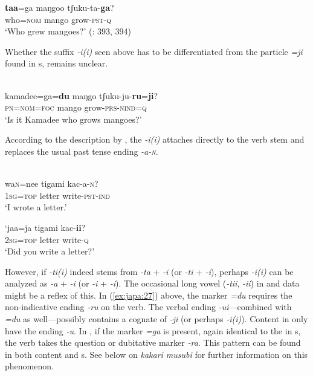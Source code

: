     \ex
    \gll \textbf{{taa}}=ga    maŋgoo  tʃuku-ta-\textbf{{ga}}?\\
    who=\textsc{nom}  mango    grow-\textsc{pst}-\textsc{q}\\
    \glt ‘Who grew mangoes?’ (\citealt{Miyara2015}: 393, 394)
    \z
    \z 

\noindent Whether the suffix \textit{-i(i)} seen above has to be differentiated from the particle \textit{=ji} found in s, remains unclear.

\ea%
    \label{ex:japa:27}
    \\
    \gll kamadee=ga=\textbf{{du}} maŋgo  tʃuku-ju-\textbf{{ru}}=\textbf{{ji}}?\\
    \textsc{pn}=\textsc{nom}=\textsc{foc}    mango  grow-\textsc{prs}-\textsc{nind}=\textsc{q}\\
    \glt ‘Is it Kamadee who grows mangoes?’ \citep[394]{Miyara2015}
    \z

\noindent According to the description by \cite[181f.]{Arakaki2003}, the  \textit{-i(i)} attaches directly to the verb stem and replaces the usual past tense ending \textit{-a-\textsc{n}}.

\ea%
    \label{ex:japa:28}
    \\
    \ea
    \gll wa\textsc{n}=nee  tigami    kac-a-\textsc{n}?\\
    1\textsc{sg}=\textsc{top}  letter    write-\textsc{pst}-\textsc{ind}\\
    \glt ‘I wrote a letter.’
    
    \ex
    \gll ‘jaa=ja  tigami    kac-\textbf{{ii}}?\\
    2\textsc{sg}=\textsc{top}  letter    write-\textsc{q}\\
    \glt ‘Did you write a letter?’ \citep[181]{Arakaki2003}
    \z
    \z

\noindent However, if \textit{-ti(i)} indeed stems from \textit{-ta} + \textit{-i} (or \textit{-ti} + \textit{-i}), perhaps \textit{-i(i)} can be analyzed as \textit{-a} + \textit{-i} (or \textit{-i} + \textit{-i}). The occasional long vowel (\textit{-tii}, \textit{-ii}) in  and  data might be a reflex of this. In (\ref{ex:japa:27}) above, the  marker \textit{=du} requires the non-indicative ending \textit{-ru} on the verb. The  verbal ending \textit{-ui}---combined with \textit{=du} as well---possibly contains a cognate of  \textit{-ji} (or perhaps \textit{-i(i)}). Content  in  only have the ending \textit{-u}. In , if the  marker \textit{=ga} is present, again identical to the  in s, the verb takes the question or dubitative marker \textit{-ra}. This pattern can be found in both content and s. See below on \textit{kakari musubi} for further information on this phenomenon.

